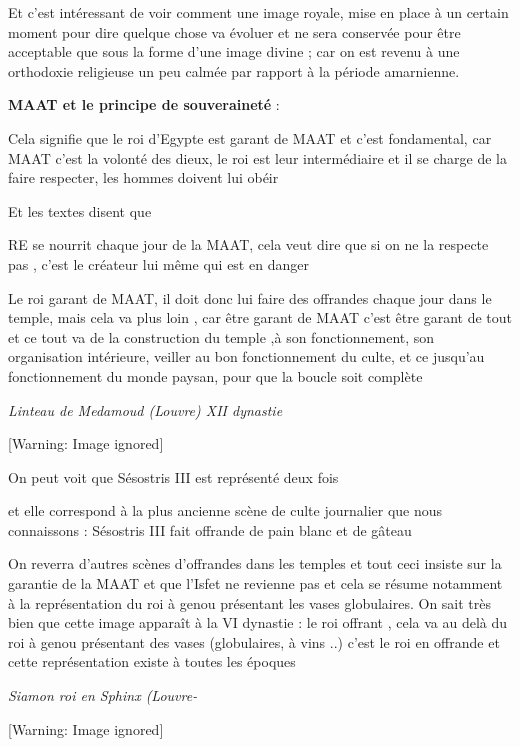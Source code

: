\documentclass[a4paper,10pt]{article}
\begin{document}
\begin{itemize}
Et c'est intéressant de voir comment une image royale,
mise en place à un certain moment pour dire quelque chose va évoluer et
ne sera conservée pour être acceptable que sous la forme
d'une image divine ; car on est revenu à une
orthodoxie religieuse un peu calmée par rapport à la période
amarnienne.

\textbf{MAAT et le principe de souveraineté} :

Cela signifie que le roi d'Egypte est garant de MAAT et
c'est fondamental, car MAAT c'est la
volonté des dieux, le roi est leur intermédiaire et il se charge de la
faire respecter, les hommes doivent lui obéir

Et les textes disent que 

RE se nourrit chaque jour de la MAAT, cela veut dire que si on ne la
respecte pas , c'est le créateur lui même qui est en
danger

Le roi garant de MAAT, il doit donc lui faire des offrandes chaque jour
dans le temple, mais cela va plus loin , car être garant de MAAT
c'est être garant de tout et ce tout va de la
construction du temple ,à son fonctionnement, son organisation
intérieure, veiller au bon fonctionnement du culte, et ce
jusqu'au fonctionnement du monde paysan, pour que la
boucle soit complète

\textit{Linteau de Medamoud (Louvre) XII dynastie}

  [Warning: Image ignored] %
 

On peut voit que Sésostris III est représenté deux fois 

et elle correspond à la plus ancienne scène de culte journalier que nous
connaissons : Sésostris III fait offrande de pain blanc et de gâteau

On reverra d'autres scènes d'offrandes
dans les temples et tout ceci insiste sur la garantie de la MAAT et que
l'Isfet ne revienne pas et cela se résume notamment à
la représentation du roi à genou présentant les vases globulaires. On
sait très bien que cette image apparaît à la VI dynastie  : le roi
offrant , cela va au delà du roi à genou présentant des vases
(globulaires, à vins ..) c'est le roi en offrande et
cette représentation existe à toutes les époques

\textit{Siamon roi en Sphinx (Louvre-}

   [Warning: Image ignored] %
 


\end{itemize}
\end{document}
